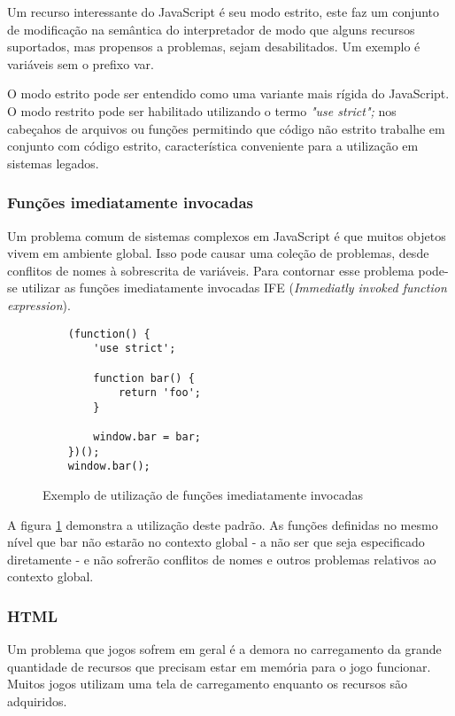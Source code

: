 Um recurso interessante do JavaScript é seu modo estrito, este faz
um conjunto de modificação na semântica do interpretador de modo
que alguns recursos suportados, mas propensos a problemas, sejam
desabilitados. Um exemplo é variáveis sem o prefixo var.

O modo estrito pode ser entendido como uma variante mais rígida
do JavaScript. O modo restrito pode ser habilitado utilizando o
termo \textit{"use strict";} nos cabeçahos de arquivos ou funções
permitindo que código não estrito trabalhe em conjunto com código
estrito, característica conveniente para a utilização em sistemas
legados.

\subsubsection{Funções imediatamente invocadas}

Um problema comum de sistemas complexos em JavaScript é que muitos
objetos vivem em ambiente global. Isso pode causar uma coleção de
problemas, desde conflitos de nomes à sobrescrita de variáveis. Para
contornar esse problema pode-se utilizar as funções imediatamente
invocadas IFE (\textit{Immediatly invoked function expression}).

\begin{figure}
\centering
\begin{verbatim}
    (function() {
        'use strict';

        function bar() {
            return 'foo';
        }

        window.bar = bar;
    })();
    window.bar();
\end{verbatim}
\caption{Exemplo de utilização de funções imediatamente invocadas}
\label{fig:iife}
\end{figure}

A figura \ref{fig:iife} demonstra a utilização deste padrão. As
funções definidas no mesmo nível que bar não estarão no contexto
global - a não ser que seja especificado diretamente - e não sofrerão
conflitos de nomes e outros problemas relativos ao contexto global.

\subsubsection{HTML}

Um problema que jogos sofrem em geral é a demora no carregamento da
grande quantidade de recursos que precisam estar em memória para o jogo
funcionar. Muitos jogos utilizam uma tela de carregamento enquanto os 
recursos são adquiridos.

